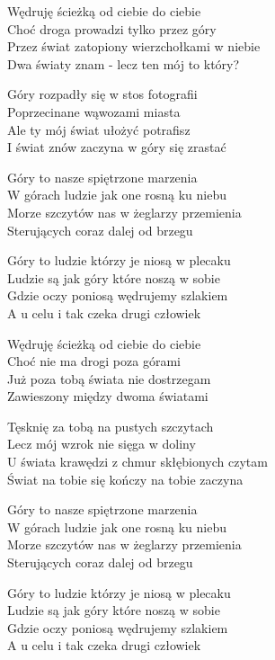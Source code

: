\begin{text}
    Wędruję ścieżką od ciebie do ciebie\\
    Choć droga prowadzi tylko przez góry\\
    Przez świat zatopiony wierzchołkami w niebie\\
    Dwa światy znam - lecz ten mój to który?

    Góry rozpadły się w stos fotografii\\
    Poprzecinane wąwozami miasta\\
    Ale ty mój świat ułożyć potrafisz\\
    I świat znów zaczyna w góry się zrastać

    Góry to nasze spiętrzone marzenia\\
    W górach ludzie jak one rosną ku niebu\\
    Morze szczytów nas w żeglarzy przemienia\\
    Sterujących coraz dalej od brzegu

    Góry to ludzie którzy je niosą w plecaku\\
    Ludzie są jak góry które noszą w sobie\\
    Gdzie oczy poniosą wędrujemy szlakiem\\
    A u celu i tak czeka drugi człowiek

    Wędruję ścieżką od ciebie do ciebie\\
    Choć nie ma drogi poza górami\\
    Już poza tobą świata nie dostrzegam\\
    Zawieszony między dwoma światami

    Tęsknię za tobą na pustych szczytach\\
    Lecz mój wzrok nie sięga w doliny\\
    U świata krawędzi z chmur skłębionych czytam\\
    Świat na tobie się kończy na tobie zaczyna

    Góry to nasze spiętrzone marzenia\\
    W górach ludzie jak one rosną ku niebu\\
    Morze szczytów nas w żeglarzy przemienia\\
    Sterujących coraz dalej od brzegu

    Góry to ludzie którzy je niosą w plecaku\\
    Ludzie są jak góry które noszą w sobie\\
    Gdzie oczy poniosą wędrujemy szlakiem\\
    A u celu i tak czeka drugi człowiek
\end{text}
